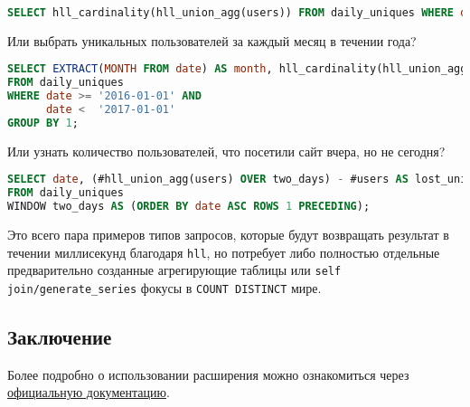 \begin{lstlisting}[language=SQL,label=lst:pghll5,caption=daily\_uniques за неделю]
SELECT hll_cardinality(hll_union_agg(users)) FROM daily_uniques WHERE date >= '2017-02-20'::date AND date <= '2017-02-26'::date;
\end{lstlisting}

Или выбрать уникальных пользователей за каждый месяц в течении года?

\begin{lstlisting}[language=SQL,label=lst:pghll6,caption=daily\_uniques за каждый месяц]
SELECT EXTRACT(MONTH FROM date) AS month, hll_cardinality(hll_union_agg(users))
FROM daily_uniques
WHERE date >= '2016-01-01' AND
      date <  '2017-01-01'
GROUP BY 1;
\end{lstlisting}

Или узнать количество пользователей, что посетили сайт вчера, но не сегодня?

\begin{lstlisting}[language=SQL,label=lst:pghll7,caption=daily\_uniques за вчера но не сегодня]
SELECT date, (#hll_union_agg(users) OVER two_days) - #users AS lost_uniques
FROM daily_uniques
WINDOW two_days AS (ORDER BY date ASC ROWS 1 PRECEDING);
\end{lstlisting}

Это всего пара примеров типов запросов, которые будут возвращать результат в течении миллисекунд благодаря \lstinline!hll!, но потребует либо полностью отдельные предварительно созданные агрегирующие таблицы или \lstinline!self join/generate_series! фокусы в \lstinline!COUNT DISTINCT! мире.

\subsection{Заключение}

Более подробно о использовании расширения можно ознакомиться через \href{https://github.com/aggregateknowledge/postgresql-hll/blob/master/README.markdown}{официальную документацию}.
